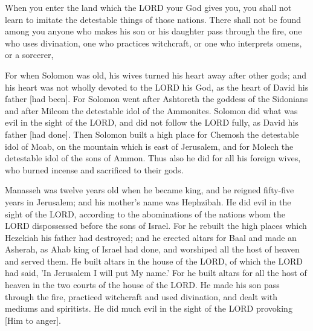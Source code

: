 \vspace{2\baselineskip}


\begin{scripture}[Deuteronomy 18:9-10]
    When you enter the land which the LORD your God gives you, you shall not learn to imitate the detestable things of those nations.
    There shall not be found among you anyone who makes his son or his daughter pass through the fire, one who uses divination, one who practices witchcraft, or one who interprets omens, or a sorcerer,
\end{scripture}


    \pagebreak

\begin{scripture}[1 Kings 11:4-8]
    For when Solomon was old, his wives turned his heart away after other gods; and his heart was not wholly devoted to the LORD his God, as the heart of David his father [had been].
    For Solomon went after Ashtoreth the goddess of the Sidonians and after Milcom the detestable idol of the Ammonites.
    Solomon did what was evil in the sight of the LORD, and did not follow the LORD fully, as David his father [had done].
    Then Solomon built a high place for Chemosh the detestable idol of Moab, on the mountain which is east of Jerusalem, and for Molech the detestable idol of the sons of Ammon.
    Thus also he did for all his foreign wives, who burned incense and sacrificed to their gods.
\end{scripture}

\vspace{2\baselineskip}

\begin{scripture}[2 Kings 21:1-6]
    Manasseh was twelve years old when he became king, and he reigned fifty-five years in Jerusalem; and his mother's name was Hephzibah.
    He did evil in the sight of the LORD, according to the abominations of the nations whom the LORD dispossessed before the sons of Israel.
    For he rebuilt the high places which Hezekiah his father had destroyed; and he erected altars for Baal and made an Asherah, as Ahab king of Israel had done, and worshiped all the host of heaven and served them.
    He built altars in the house of the LORD, of which the LORD had said, 'In Jerusalem I will put My name.'
    For he built altars for all the host of heaven in the two courts of the house of the LORD.
    He made his son pass through the fire, practiced witchcraft and used divination, and dealt with mediums and spiritists. He did much evil in the sight of the LORD provoking [Him to anger].
\end{scripture}

